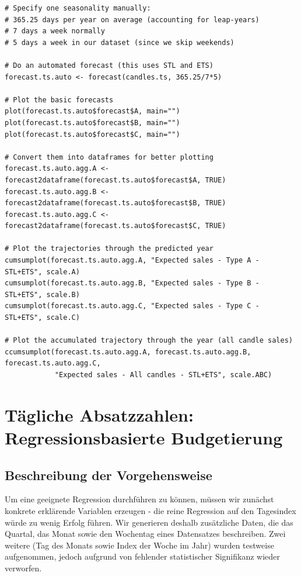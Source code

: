 \documentclass[a4paper,11pt]{article}
\begin{document}
\begin{lstlisting}
# Specify one seasonality manually:
# 365.25 days per year on average (accounting for leap-years)
# 7 days a week normally
# 5 days a week in our dataset (since we skip weekends)

# Do an automated forecast (this uses STL and ETS)
forecast.ts.auto <- forecast(candles.ts, 365.25/7*5)

# Plot the basic forecasts
plot(forecast.ts.auto$forecast$A, main="")
plot(forecast.ts.auto$forecast$B, main="")
plot(forecast.ts.auto$forecast$C, main="")

# Convert them into dataframes for better plotting
forecast.ts.auto.agg.A <- forecast2dataframe(forecast.ts.auto$forecast$A, TRUE)
forecast.ts.auto.agg.B <- forecast2dataframe(forecast.ts.auto$forecast$B, TRUE)
forecast.ts.auto.agg.C <- forecast2dataframe(forecast.ts.auto$forecast$C, TRUE)

# Plot the trajectories through the predicted year
cumsumplot(forecast.ts.auto.agg.A, "Expected sales - Type A - STL+ETS", scale.A)
cumsumplot(forecast.ts.auto.agg.B, "Expected sales - Type B - STL+ETS", scale.B)
cumsumplot(forecast.ts.auto.agg.C, "Expected sales - Type C - STL+ETS", scale.C)

# Plot the accumulated trajectory through the year (all candle sales)
ccumsumplot(forecast.ts.auto.agg.A, forecast.ts.auto.agg.B, forecast.ts.auto.agg.C,
            "Expected sales - All candles - STL+ETS", scale.ABC)
\end{lstlisting}

\newpage
\section{Tägliche Absatzzahlen: Regressionsbasierte Budgetierung}

\subsection{Beschreibung der Vorgehensweise}

Um eine geeignete Regression durchführen zu können, müssen wir zunächst konkrete erklärende Variablen erzeugen - die reine Regression auf den Tagesindex würde zu wenig Erfolg führen. Wir generieren deshalb zusätzliche Daten, die das Quartal, das Monat sowie den Wochentag eines Datensatzes beschreiben. Zwei weitere (Tag des Monats sowie Index der Woche im Jahr) wurden testweise aufgenommen, jedoch aufgrund von fehlender statistischer Signifikanz wieder verworfen.\\
\end{document}
